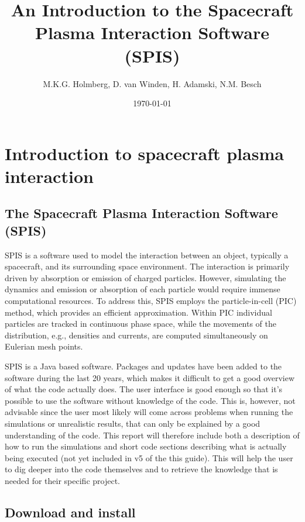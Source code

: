 \documentclass[a4paper, 11pt]{article}
\title{An Introduction to the Spacecraft Plasma Interaction Software (SPIS)}
\date{\today}
\author{M.K.G. Holmberg, D. van Winden, H. Adamski, N.M. Besch}
\begin{document}
\maketitle

\newpage
\tableofcontents
\newpage

\section{Introduction to spacecraft plasma interaction}

\subsection{The Spacecraft Plasma Interaction Software (SPIS)}

SPIS is a software used to model the interaction between an object, typically a spacecraft, and its surrounding space environment. The interaction is primarily driven by absorption or emission of charged particles. However, simulating the dynamics and emission or absorption of each particle would require immense computational resources. To address this, SPIS employs the particle-in-cell (PIC) method, which provides an efficient approximation. Within PIC individual particles are tracked in continuous phase space, while the movements of the distribution, e.g., densities and currents, are computed simultaneously on Eulerian mesh points.\par
SPIS is a Java based software. Packages and updates have been added to the software during the last 20 years, which makes it difficult to get a good overview of what the code actually does. The user interface is good enough so that it's possible to use the software without knowledge of the code. This is, however, not advisable since the user most likely will come across problems when running the simulations or unrealistic results, that can only be explained by a good understanding of the code. This report will therefore include both a description of how to run the simulations and short code sections describing what is actually being executed (not yet included in v5 of the this guide). This will help the user to dig deeper into the code themselves and to retrieve the knowledge that is needed for their specific project.

\subsection{Download and install}
\end{document}
